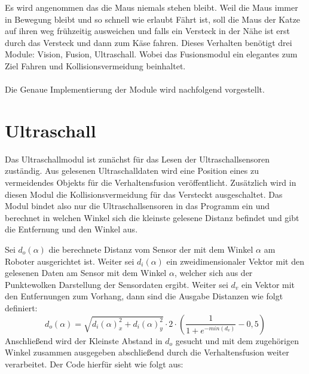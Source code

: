 \documentclass[11pt,a4paper]{article}
\begin{document}
Es wird angenommen das die Maus niemals stehen bleibt. Weil die Maus immer in Bewegung bleibt und so schnell wie erlaubt Fährt ist, soll die Maus der Katze auf ihren weg frühzeitig ausweichen und falls ein Versteck in der Nähe ist erst durch das Versteck und dann zum Käse fahren. Dieses Verhalten benötigt drei Module: Vision, Fusion, Ultraschall. Wobei das Fusionsmodul ein elegantes zum Ziel Fahren und Kollisionsvermeidung beinhaltet. \\\\
Die Genaue Implementierung der Module wird nachfolgend vorgestellt.
\newpage
\section{Ultraschall}
Das Ultraschallmodul ist zunächst für das Lesen der Ultraschallsensoren zuständig. Aus gelesenen Ultraschalldaten wird eine Position eines zu vermeidendes Objekts für die Verhaltensfusion veröffentlicht. Zusätzlich wird in diesen Modul die Kollisionsvermeidung für das Versteckt ausgeschaltet. Das Modul bindet also nur die Ultraschallsensoren in das Programm ein und berechnet in welchen Winkel sich die kleinste gelesene Distanz befindet und gibt die Entfernung und den Winkel aus. 

Sei $d_o(\alpha)$ die berechnete Distanz vom Sensor der mit dem Winkel $\alpha$ am Roboter ausgerichtet ist. Weiter sei $d_i(\alpha)$ ein zweidimensionaler Vektor mit den gelesenen Daten am Sensor mit dem Winkel $\alpha$, welcher sich aus der Punktewolken Darstellung der Sensordaten ergibt. Weiter sei $d_v$ ein Vektor mit den Entfernungen zum Vorhang, dann sind die Ausgabe Distanzen wie folgt definiert:    
\begin{equation}
d_o(\alpha)=\sqrt{d_i(\alpha)_x^2+d_i(\alpha)_y^2}\cdot 2\cdot(\frac{1}{1+e^{-min(d_v)}}-0,5)
\end{equation}
Anschließend wird der Kleinste Abstand in $d_o$ gesucht und mit dem zugehörigen Winkel zusammen ausgegeben abschließend durch die Verhaltensfusion weiter verarbeitet. Der Code hierfür sieht wie folgt aus:
  
\end{document}
